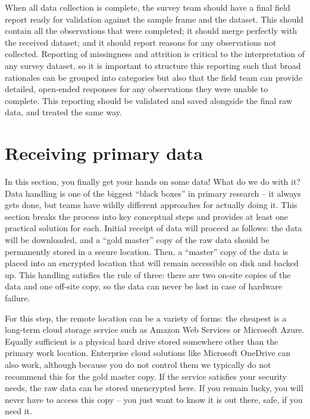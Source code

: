 When all data collection is complete,
the survey team should have a final field report
ready for validation against the sample frame and the dataset.
This should contain all the observations that were completed;
it should merge perfectly with the received dataset;
and it should report reasons for any observations not collected.
Reporting of missingness and attrition is critical
to the interpretation of any survey dataset,
so it is important to structure this reporting
such that broad rationales can be grouped into categories
but also that the field team can provide detailed, open-ended responses
for any observations they were unable to complete.
This reporting should be validated and saved
alongside the final raw data, and treated the same way.



\section{Receiving primary data}

In this section, you finally get your hands on some data!
What do we do with it? Data handling is one of the biggest
``black boxes'' in primary research -- it always gets done,
but teams have wildly different approaches for actually doing it.
This section breaks the process into key conceptual steps
and provides at least one practical solution for each.
Initial receipt of data will proceed as follows:
the data will be downloaded, and a ``gold master'' copy
of the raw data should be permanently stored in a secure location.
Then, a ``master'' copy of the data is placed into an encrypted location
that will remain accessible on disk and backed up.
This handling satisfies the rule of three:
there are two on-site copies of the data and one off-site copy,
so the data can never be lost in case of hardware failure.

For this step, the remote location can be a variety of forms:
the cheapest is a long-term cloud storage service
such as Amazon Web Services or Microsoft Azure.
Equally sufficient is a physical hard drive
stored somewhere other than the primary work location.
Enterprise cloud solutions like Microsoft OneDrive
can also work, although because you do not control them
we typically do not recommend this for the gold master copy.
If the service satisfies your security needs,
the raw data can be stored unencrypted here.
If you remain lucky, you will never have to access this copy --
you just want to know it is out there, safe, if you need it.

